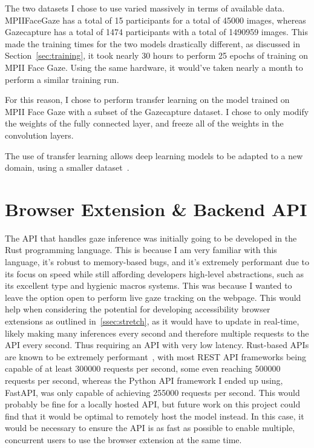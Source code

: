 \documentclass{report}
\begin{document}
The two datasets I chose to use varied massively in terms of available data. MPIIFaceGaze has a total of 15 participants for a total of 45000 images, whereas Gazecapture has a total of 1474 participants with a total of 1490959 images. This made the training times for the two models drastically different, as discussed in Section~\ref{sec:training}, it took nearly 30 hours to perform 25 epochs of training on MPII Face Gaze. Using the same hardware, it would've taken nearly a month to perform a similar training run. 

For this reason, I chose to perform transfer learning on the model trained on MPII Face Gaze with a subset of the Gazecapture dataset. I chose to only modify the weights of the fully connected layer, and freeze all of the weights in the convolution layers. 

The use of transfer learning allows deep learning models to be adapted to a new domain, using a smaller dataset~\cite{koehrsen2018transfer}. 


\section{Browser Extension \& Backend API}

The API that handles gaze inference was initially going to be developed in the Rust programming language. This is because I am very familiar with this language, it's robust to memory-based bugs, and it's extremely performant due to its focus on speed while still affording developers high-level abstractions, such as its excellent type and hygienic macros systems. This was because I wanted to leave the option open to perform live gaze tracking on the webpage. This would help when considering the potential for developing accessibility browser extensions as outlined in~\autoref{ssec:stretch}, as it would have to update in real-time, likely making many inferences every second and therefore multiple requests to the API every second. Thus requiring an API with very low latency. Rust-based APIs are known to be extremely performant~\cite{ali2020benchmark}, with most REST API frameworks being capable of at least 300000 requests per second, some even reaching 500000 requests per second, whereas the Python API framework I ended up using, FastAPI, was only capable of achieving 255000 requests per second. This would probably be fine for a locally hosted API, but future work on this project could find that it would be optimal to remotely host the model instead. In this case, it would be necessary to ensure the API is as fast as possible to enable multiple, concurrent users to use the browser extension at the same time. 
\end{document}
